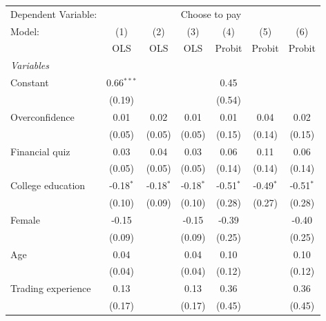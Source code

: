 \begingroup
\centering
\begin{tabular}{lcccccc}
   \tabularnewline \midrule \midrule
   Dependent Variable: & \multicolumn{6}{c}{Choose to pay}\\
   Model:             & (1)          & (2)         & (3)         & (4)         & (5)         & (6)\\  
                      &  OLS         & OLS         & OLS         & Probit      & Probit      & Probit\\  
   \midrule
   \emph{Variables}\\
   Constant           & 0.66$^{***}$ &             &             & 0.45        &             &   \\   
                      & (0.19)       &             &             & (0.54)      &             &   \\   
   Overconfidence     & 0.01         & 0.02        & 0.01        & 0.01        & 0.04        & 0.02\\   
                      & (0.05)       & (0.05)      & (0.05)      & (0.15)      & (0.14)      & (0.15)\\   
   Financial quiz     & 0.03         & 0.04        & 0.03        & 0.06        & 0.11        & 0.06\\   
                      & (0.05)       & (0.05)      & (0.05)      & (0.14)      & (0.14)      & (0.14)\\   
   College education  & -0.18$^{*}$  & -0.18$^{*}$ & -0.18$^{*}$ & -0.51$^{*}$ & -0.49$^{*}$ & -0.51$^{*}$\\   
                      & (0.10)       & (0.09)      & (0.10)      & (0.28)      & (0.27)      & (0.28)\\   
   Female             & -0.15        &             & -0.15       & -0.39       &             & -0.40\\   
                      & (0.09)       &             & (0.09)      & (0.25)      &             & (0.25)\\   
   Age                & 0.04         &             & 0.04        & 0.10        &             & 0.10\\   
                      & (0.04)       &             & (0.04)      & (0.12)      &             & (0.12)\\   
   Trading experience & 0.13         &             & 0.13        & 0.36        &             & 0.36\\   
                      & (0.17)       &             & (0.17)      & (0.45)      &             & (0.45)\\   

\end{tabular}
